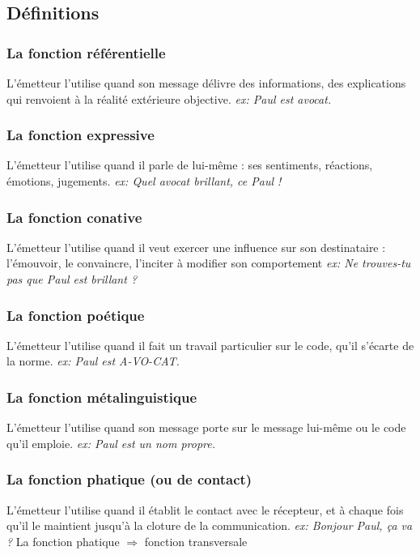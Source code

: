 \documentclass[a4paper,11pt]{report}
\begin{document}
\subsection{Définitions}
\subsubsection{La fonction référentielle}
L'émetteur l'utilise quand son message délivre des informations, des explications qui renvoient à  la réalité extérieure objective.
\textit{ex: Paul est avocat.}

\subsubsection{La fonction expressive}
L'émetteur l'utilise quand il parle de lui-même : ses sentiments, réactions, émotions, jugements.
\textit{ex: Quel avocat brillant, ce Paul !}

\subsubsection{La fonction conative}
L'émetteur l'utilise quand il veut exercer une influence sur son destinataire : l'émouvoir, le convaincre, l'inciter à modifier son comportement
\textit{ex: Ne trouves-tu pas que Paul est brillant ?}

\subsubsection{La fonction poétique}
L'émetteur l'utilise quand il fait un travail particulier sur le code, qu'il s'écarte de la norme.
\textit{ex: Paul est A-VO-CAT.}

\subsubsection{La fonction métalinguistique}
L'émetteur l'utilise quand son message porte sur le message lui-même ou le code qu'il emploie.
\textit{ex: Paul est un nom propre.}

\subsubsection{La fonction phatique (ou de contact)}
L'émetteur l'utilise quand il établit le contact avec le récepteur, et à chaque fois qu'il le maintient jusqu'à la cloture de la communication.
\textit{ex: Bonjour Paul, ça va ?}
La fonction phatique $\Rightarrow$ fonction transversale
\end{document}
